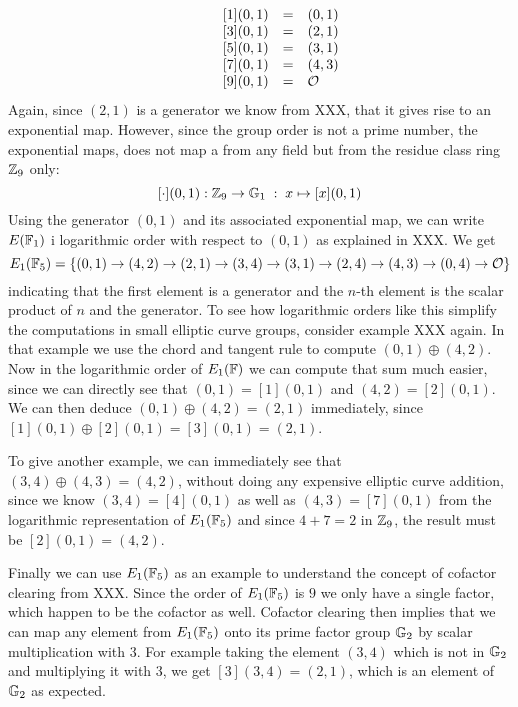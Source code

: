 \begin{example}
$$\begin{array}{lccr}
\begin{array}{lcl}
\end{array} & & &
{}\begin{array}{lcl}
{}[1](0,1) &=& (0, 1) \\
{}[3](0,1) &=& (2, 1) \\
{}[5](0,1) &=& (3, 1) \\
{}[7](0,1) &=& (4, 3) \\
{}[9](0,1) &=& \mathcal{O}
\end{array}
\end{array}
$$
Again, since $(2,1)$ is a generator we know from XXX, that it gives rise to an exponential map. However, since the group order is not a prime number, the exponential maps, does not map a from any field but from the residue class ring $\mathbb{Z}_9$ only:
$$
[\cdot](0,1): \mathbb{Z}_9 \to \mathbb{G}_1\; : \; x\mapsto [x](0,1) 
$$
Using the generator $(0,1)$ and its associated exponential map, we can write $E(\mathbb{F}_1)$ i logarithmic order with respect to $(0,1)$ as explained in XXX. We get
$$
E_1(\mathbb{F}_5) = \{(0, 1)\to (4, 2)\to (2, 1)\to (3, 4)\to (3, 1)\to (2, 4)\to (4, 3)\to (0, 4)\to \mathcal{O} \}
$$
indicating that the first element is a generator and the $n$-th element is the scalar product of $n$ and the generator. To see how logarithmic orders like this simplify the computations in small elliptic curve groups, consider example XXX again. In that example we use the chord and tangent rule to compute $(0,1)\oplus (4,2)$. Now in the logarithmic order of $E_1(\mathbb{F})$ we can compute that sum much easier, since we can directly see that $(0,1)=[1](0,1)$ and $(4,2)=[2](0,1)$. We can then deduce $(0,1)\oplus (4,2)= (2,1)$ immediately, since $[1](0,1)\oplus [2](0,1)= [3](0,1)=(2,1)$.

To give another example, we can immediately see that $(3,4)\oplus (4,3) = (4,2)$, without doing any expensive elliptic curve addition, since we know $(3,4)= [4](0,1)$ as well as $(4,3)= [7](0,1)$ from the logarithmic representation of $E_1(\mathbb{F}_5)$ and since $4+7 = 2$ in $\mathbb{Z}_9$, the result must be $[2](0,1)=(4,2)$.

Finally we can use $E_1(\mathbb{F}_5)$ as an example to understand the concept of cofactor clearing from XXX. Since the order of $E_1(\mathbb{F}_5)$ is $9$ we only have a single factor, which happen to be the cofactor as well. Cofactor clearing then implies that we can map any element from $E_1(\mathbb{F}_5)$ onto its prime factor group $\mathbb{G}_2$ by scalar multiplication with $3$. For example taking the element $(3,4)$ which is not in $\mathbb{G}_2$ and multiplying it with $3$, we get $[3](3,4)= (2,1)$, which is an element of $\mathbb{G}_2$ as expected.
\end{example}

